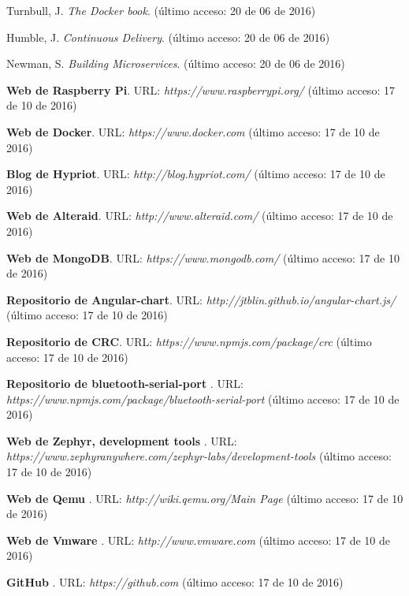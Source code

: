 \documentclass[spanish,final]{setup/eetac_tfc_pfc}
\begin{document}
\cleardoublepage
{}
\begin{thebibliography}{2}


Turnbull, J. {\it The Docker book}.
(último acceso: 20 de 06 de 2016)

Humble, J. {\it Continuous Delivery}.
(último acceso: 20 de 06 de 2016)

Newman, S. {\it Building Microservices}.
(último acceso: 20 de 06 de 2016)

{\bf Web de Raspberry Pi}. URL: {\it https://www.raspberrypi.org/}
(último acceso: 17 de 10 de 2016)

{\bf Web de Docker}. URL: {\it https://www.docker.com}
(último acceso: 17 de 10 de 2016)

{\bf Blog de Hypriot}.  URL: {\it http://blog.hypriot.com/}
(último acceso: 17 de 10 de 2016)

{\bf Web de Alteraid}.  URL: {\it http://www.alteraid.com/}
(último acceso: 17 de 10 de 2016)

{\bf Web de MongoDB}.  URL: {\it https://www.mongodb.com/}
(último acceso: 17 de 10 de 2016)

{\bf Repositorio de Angular-chart}.  URL: {\it http://jtblin.github.io/angular-chart.js/}
(último acceso: 17 de 10 de 2016)

{\bf Repositorio de CRC}.  URL: {\it https://www.npmjs.com/package/crc}
(último acceso: 17 de 10 de 2016)

{\bf Repositorio de bluetooth-serial-port }.  URL: {\it https://www.npmjs.com/package/bluetooth-serial-port}
(último acceso: 17 de 10 de 2016)

{\bf Web de Zephyr, development tools }.  URL: {\it https://www.zephyranywhere.com/zephyr-labs/development-tools}
(último acceso: 17 de 10 de 2016)

{\bf Web de Qemu }.  URL: {\it http://wiki.qemu.org/Main Page}
(último acceso: 17 de 10 de 2016)

{\bf Web de Vmware }.  URL: {\it http://www.vmware.com}
(último acceso: 17 de 10 de 2016)

{\bf GitHub }.  URL: {\it https://github.com}
(último acceso: 17 de 10 de 2016)



\end{thebibliography}
\end{document}
